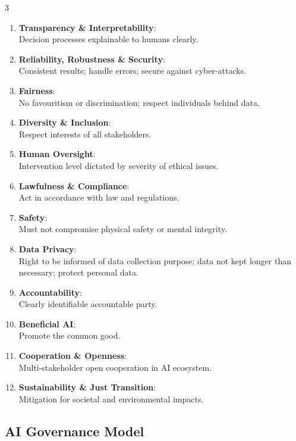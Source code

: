 \documentclass[a4paper,7pt]{extarticle}
\begin{document}
\begin{multicols}{3}
\begin{defbox}
\begin{enumerate}[leftmargin=1.2em]
  \item \textbf{Transparency \& Interpretability}:\\
    Decision processes explainable to humans clearly.
  \item \textbf{Reliability, Robustness \& Security}:\\
    Consistent results; handle errors; secure against cyber-attacks.
  \item \textbf{Fairness}:\\
    No favouritism or discrimination; respect individuals behind data.
  \item \textbf{Diversity \& Inclusion}:\\
    Respect interests of all stakeholders.
  \item \textbf{Human Oversight}:\\
    Intervention level dictated by severity of ethical issues.
  \item \textbf{Lawfulness \& Compliance}:\\
    Act in accordance with law and regulations.
  \item \textbf{Safety}:\\
    Must not compromise physical safety or mental integrity.
  \item \textbf{Data Privacy}:\\
    Right to be informed of data collection purpose; data not kept longer than necessary; protect personal data.
  \item \textbf{Accountability}:\\
    Clearly identifiable accountable party.
  \item \textbf{Beneficial AI}:\\
    Promote the common good.
  \item \textbf{Cooperation \& Openness}:\\
    Multi-stakeholder open cooperation in AI ecosystem.
  \item \textbf{Sustainability \& Just Transition}:\\
    Mitigation for societal and environmental impacts.
\end{enumerate}
\end{defbox}

\subsection{AI Governance Model}


\end{multicols}
\end{document}
